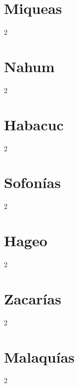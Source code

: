 \chapter{Miqueas}
\begin{multicols}{2}
  \raggedcolumns
  \parskip=0pt \relax
  
\end{multicols}

\chapter{Nahum}
\begin{multicols}{2}
  \raggedcolumns
  \parskip=0pt \relax
  
\end{multicols}

\chapter{Habacuc}
\begin{multicols}{2}
  \raggedcolumns
  \parskip=0pt \relax
  
\end{multicols}

\chapter{Sofonías}
\begin{multicols}{2}
  \raggedcolumns
  \parskip=0pt \relax
  
\end{multicols}

\chapter{Hageo}
\begin{multicols}{2}
  \raggedcolumns
  \parskip=0pt \relax
  
\end{multicols}

\chapter{Zacarías}
\begin{multicols}{2}
  \raggedcolumns
  \parskip=0pt \relax
  
\end{multicols}

\chapter{Malaquías}
\begin{multicols}{2}
  \raggedcolumns
  \parskip=0pt \relax
  
\end{multicols}

